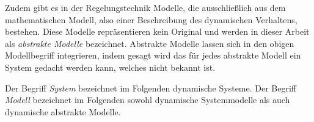 Zudem gibt es in der Regelungstechnik Modelle, die ausschließlich aus dem mathematischen Modell, also einer Beschreibung des dynamischen Verhaltens, bestehen. Diese Modelle repräsentieren kein Original und werden in dieser Arbeit als \textit{abstrakte Modelle} bezeichnet. Abstrakte Modelle lassen sich in den obigen Modellbegriff integrieren, indem gesagt wird das für jedes abstrakte Modell ein System gedacht werden kann, welches nicht bekannt ist. 

Der Begriff \textit{System} bezeichnet im Folgenden dynamische Systeme. Der Begriff \textit{Modell} bezeichnet im Folgenden sowohl dynamische Systemmodelle als auch dynamische abstrakte Modelle.

